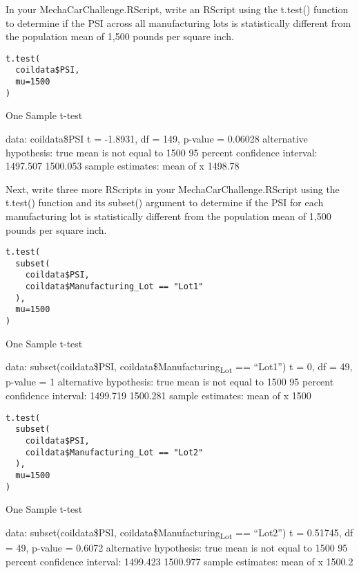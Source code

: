 \documentclass[11pt]{article}
\begin{document}
In your MechaCarChallenge.RScript, write an RScript using the t.test() function to determine if the PSI across all manufacturing lots is statistically different from the population mean of 1,500 pounds per square inch.

\begin{verbatim}
t.test(
  coildata$PSI,
  mu=1500
)
\end{verbatim}

\begin{org}


One Sample t-test

data:  coildata\$PSI
t = -1.8931, df = 149, p-value = 0.06028
alternative hypothesis: true mean is not equal to 1500
95 percent confidence interval:
 1497.507 1500.053
sample estimates:
mean of x
  1498.78
\end{org}

Next, write three more RScripts in your MechaCarChallenge.RScript using the t.test() function and its subset() argument to determine if the PSI for each manufacturing lot is statistically different from the population mean of 1,500 pounds per square inch.

\begin{verbatim}
t.test(
  subset(
    coildata$PSI,
    coildata$Manufacturing_Lot == "Lot1"
  ),
  mu=1500
)
\end{verbatim}

\begin{org}


One Sample t-test

data:  subset(coildata\$PSI, coildata\$Manufacturing\textsubscript{Lot} == ``Lot1'')
t = 0, df = 49, p-value = 1
alternative hypothesis: true mean is not equal to 1500
95 percent confidence interval:
 1499.719 1500.281
sample estimates:
mean of x
     1500
\end{org}

\begin{verbatim}
t.test(
  subset(
    coildata$PSI,
    coildata$Manufacturing_Lot == "Lot2"
  ),
  mu=1500
)
\end{verbatim}

\begin{org}


One Sample t-test

data:  subset(coildata\$PSI, coildata\$Manufacturing\textsubscript{Lot} == ``Lot2'')
t = 0.51745, df = 49, p-value = 0.6072
alternative hypothesis: true mean is not equal to 1500
95 percent confidence interval:
 1499.423 1500.977
sample estimates:
mean of x
   1500.2
\end{org}
\end{document}
